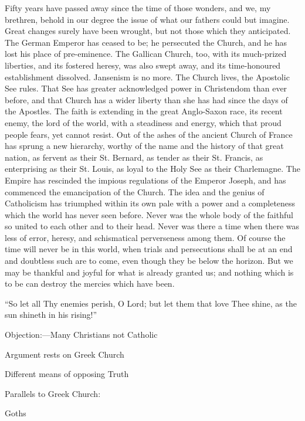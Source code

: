 Fifty years have passed away since the time of those wonders, and
we, my brethren, behold in our degree the issue of what our fathers
could but imagine. Great changes surely have been wrought, but not
those which they anticipated. The German Emperor has ceased to be; he
persecuted the Church, and he has lost his place of pre-eminence. The
Gallican Church, too, with its much-prized liberties, and its fostered
heresy, was also swept away, and its time-honoured establishment
dissolved. Jansenism is no more. The Church lives, the Apostolic See
rules. That See has greater acknowledged power in Christendom than
ever before, and that Church has a wider liberty than she has had
since the days of the Apostles. The faith is extending in the great
Anglo-Saxon race, its recent enemy, the lord of the world, with a
steadiness and energy, which that proud people fears, yet cannot
resist. Out of the ashes of the ancient Church of France has sprung a
new hierarchy, worthy of the name and the history of that great
nation, as fervent as their St. Bernard, as tender as their St.
Francis, as enterprising as their St. Louis, as loyal to the Holy See
as their Charlemagne. The Empire has rescinded the impious regulations
of the Emperor Joseph, and has commenced the emancipation of the
Church. The idea and the genius of Catholicism has triumphed within
its own pale with a power and a completeness which the world has never
seen before. Never was the whole body of the faithful so united to
each other and to their head. Never was there a time when there was
less of error, heresy, and schismatical perverseness among them. Of
course the time will never be in this world, when trials and
persecutions shall be at an end and doubtless such are to come, even
though they be below the horizon. But we may be thankful and joyful
for what is already granted us; and nothing which is to be can destroy
the mercies which have been.

``So let all Thy enemies perish, O Lord; but let them that love
Thee shine, as the sun shineth in his rising!''


Objection:—Many Christians not
Catholic

Argument rests on Greek Church

Different means of opposing Truth

Parallels to Greek Church:

Goths

